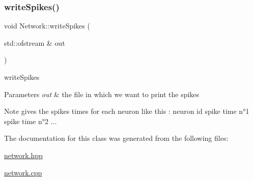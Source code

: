 \subsubsection{\texorpdfstring{write\+Spikes()}{writeSpikes()}}
{\footnotesize\ttfamily void Network\+::write\+Spikes (\begin{DoxyParamCaption}\item[{std\+::ofstream \&}]{out }\end{DoxyParamCaption})}

write\+Spikes


\begin{DoxyParams}{Parameters}
{\em out} & the file in which we want to print the spikes \\
\hline
\end{DoxyParams}
\begin{DoxyNote}{Note}
gives the spike\textquotesingle{}s times for each neuron like this \+: neuron id spike time n°1 spike time n°2 ... 
\end{DoxyNote}


The documentation for this class was generated from the following files\+:\begin{DoxyCompactItemize}
\item 
\hyperlink{network_8hpp}{network.\+hpp}\item 
\hyperlink{network_8cpp}{network.\+cpp}\end{DoxyCompactItemize}
